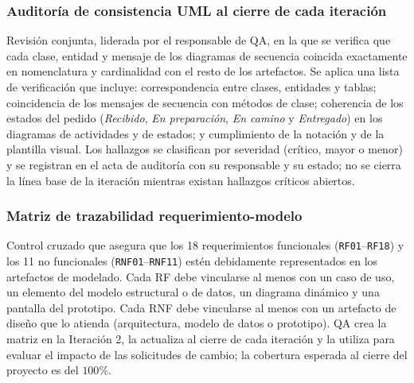 \subsubsection{Auditoría de consistencia UML al cierre de cada iteración}
Revisión conjunta, liderada por el responsable de QA, en la que se verifica que cada clase, entidad y mensaje de los diagramas de secuencia coincida exactamente en nomenclatura y cardinalidad con el resto de los artefactos. Se aplica una lista de verificación que incluye: correspondencia entre clases, entidades y tablas; coincidencia de los mensajes de secuencia con métodos de clase; coherencia de los estados del pedido (\textit{Recibido}, \textit{En preparación}, \textit{En camino} y \textit{Entregado}) en los diagramas de actividades y de estados; y cumplimiento de la notación y de la plantilla visual. Los hallazgos se clasifican por severidad (crítico, mayor o menor) y se registran en el acta de auditoría con su responsable y su estado; no se cierra la línea base de la iteración mientras existan hallazgos críticos abiertos.

\subsubsection{Matriz de trazabilidad requerimiento-modelo}
Control cruzado que asegura que los 18 requerimientos funcionales (\texttt{RF01}--\texttt{RF18}) y los 11 no funcionales (\texttt{RNF01}--\texttt{RNF11}) estén debidamente representados en los artefactos de modelado. Cada RF debe vincularse al menos con un caso de uso, un elemento del modelo estructural o de datos, un diagrama dinámico y una pantalla del prototipo. Cada RNF debe vincularse al menos con un artefacto de diseño que lo atienda (arquitectura, modelo de datos o prototipo). QA crea la matriz en la Iteración 2, la actualiza al cierre de cada iteración y la utiliza para evaluar el impacto de las solicitudes de cambio; la cobertura esperada al cierre del proyecto es del $100\%$.

